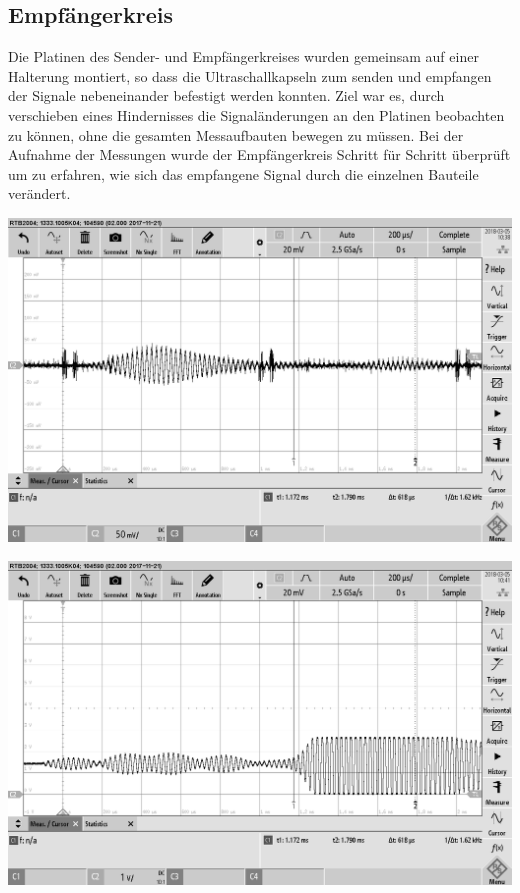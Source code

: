 \subsection{Empfängerkreis}
Die Platinen des Sender- und Empfängerkreises wurden gemeinsam auf einer Halterung montiert, so dass die Ultraschallkapseln zum senden und empfangen der Signale nebeneinander befestigt werden konnten. Ziel war es, durch verschieben eines Hindernisses die Signaländerungen an den Platinen beobachten zu können, ohne die gesamten Messaufbauten bewegen zu müssen. Bei der Aufnahme der Messungen wurde der Empfängerkreis Schritt für Schritt überprüft um zu erfahren, wie sich das empfangene Signal durch die einzelnen Bauteile verändert.\\
\begin{minipage}{0.5\textwidth}
\includegraphics[width=1\textwidth%
]{Abbildungen/MessungenP1/Signal-Empfang.png}
\label{fig:Empfang am LS}
\end{minipage}
\begin{minipage}{0.5\textwidth}
\includegraphics[width=1\textwidth%
]{Abbildungen/MessungenP1/Signal-nach-Verstarkung.png}
\label{fig:Verstaerkung}
\end{minipage}
